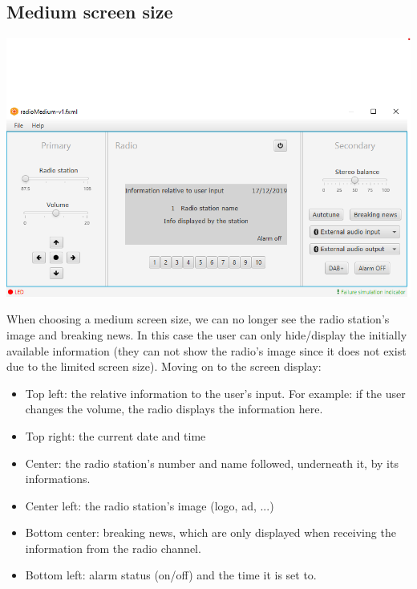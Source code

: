 \documentclass[11pt]{article}
\begin{document}
\subsection{Medium screen size}
\vspace{10px}
\begin{center}
\includegraphics[width=15cm]{../Screenshots/radioMedium-v2.png}\\
\end{center}
When choosing a medium screen size, we can no longer see the radio station's image and breaking news. In this case the user can only hide/display the initially available information (they can not show the radio's image since it does not exist due to the limited screen size). Moving on to the screen display:
\begin{itemize}
\item Top left: the relative information to the user's input. For example: if the user changes the volume, the radio displays the information here.
\item Top right: the current date and time
\item Center: the radio station's number and name followed, underneath it, by its informations.
\item Center left: the radio station's image (logo, ad, ...)
\item Bottom center: breaking news, which are only displayed when receiving the information from the radio channel.
\item Bottom left: alarm status (on/off) and the time it is set to.
\end{itemize}
\end{document}
